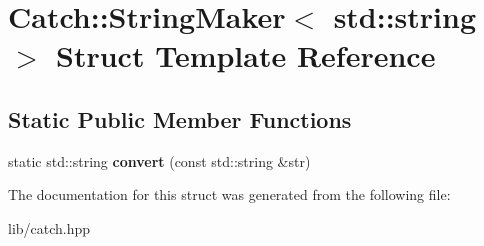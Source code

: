\hypertarget{struct_catch_1_1_string_maker_3_01std_1_1string_01_4}{}\section{Catch\+:\+:String\+Maker$<$ std\+:\+:string $>$ Struct Template Reference}
\label{struct_catch_1_1_string_maker_3_01std_1_1string_01_4}
\subsection*{Static Public Member Functions}
\begin{DoxyCompactItemize}
\item 
\mbox{\label{struct_catch_1_1_string_maker_3_01std_1_1string_01_4_ae065b2ecc5c1a6c4409cf06d604bd66d}} 
static std\+::string {\bfseries convert} (const std\+::string \&str)
\end{DoxyCompactItemize}


The documentation for this struct was generated from the following file\+:\begin{DoxyCompactItemize}
\item 
lib/catch.\+hpp\end{DoxyCompactItemize}
